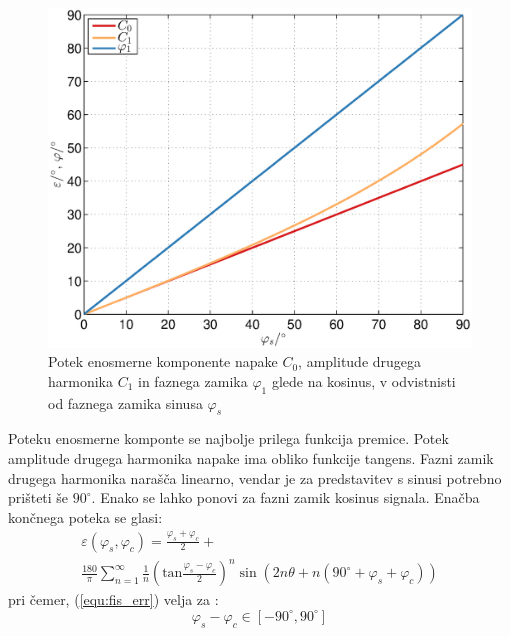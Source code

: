 \documentclass[a4paper]{article}
\begin{document}
\begin{figure}[!htb]
	\begin{center}
		\includegraphics[width=\linewidth]{./Slike/fis.eps}
		\caption{Potek enosmerne komponente napake $C_0$, amplitude drugega harmonika $C_1$ in faznega zamika $\varphi_1$ glede na kosinus, v odvistnisti od faznega zamika sinusa $\varphi_{s}$} \label{fig:fis}
	\end{center}
\end{figure}
Poteku enosmerne komponte se najbolje prilega funkcija premice.
Potek amplitude drugega harmonika napake ima obliko funkcije tangens.
Fazni zamik drugega harmonika narašča linearno, vendar je za predstavitev s sinusi potrebno prišteti še $90^\circ$. Enako se lahko ponovi za fazni zamik kosinus signala.
Enačba končnega poteka se glasi:
\begin{multline}
\label{equ:fis_err}
\varepsilon(\varphi_{s},\varphi_{c}) = \frac{\varphi_{s}+\varphi_{c}}{2}+\\ \frac{180}{\pi}\sum_{n=1}^{\infty}\frac{1}{n} (\mathrm{tan}\frac{\varphi_{s}-\varphi_{c}}{2})^n \sin (2n \theta+n(90^\circ +\varphi_{s}+\varphi_{c}))
\end{multline}
pri čemer, (\ref{equ:fis_err}) velja za :
$$ \varphi_{s}-\varphi_{c} \in [ -90^\circ , 90^\circ ] $$
\end{document}
